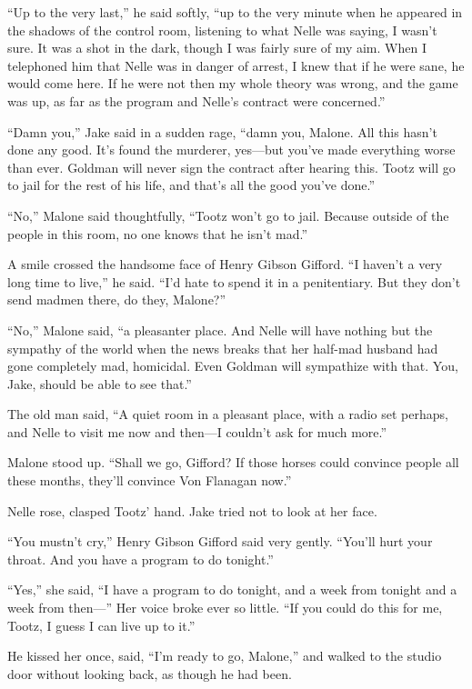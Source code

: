 \documentclass{novel}
\begin{document}
“Up to the very last,” he said softly, “up to the very minute when he appeared in the shadows of the control room, listening to what Nelle was saying, I wasn’t sure. It was a shot in the dark, though I was fairly sure of my aim. When I telephoned him that Nelle was in danger of arrest, I knew that if he were sane, he would come here. If he were not then my whole theory was wrong, and the game was up, as far as the program and Nelle’s contract were concerned.”

“Damn you,” Jake said in a sudden rage, “damn you, Malone. All this hasn’t done any good. It’s found the murderer, yes—but you’ve made everything worse than ever. Goldman will never sign the contract after hearing this. Tootz will go to jail for the rest of his life, and that’s all the good you’ve done.”

“No,” Malone said thoughtfully, “Tootz won’t go to jail. Because outside of the people in this room, no one knows that he isn’t mad.”

A smile crossed the handsome face of Henry Gibson Gifford. “I haven’t a very long time to live,” he said. “I’d hate to spend it in a penitentiary. But they don’t send madmen there, do they, Malone?”

“No,” Malone said, “a pleasanter place. And Nelle will have nothing but the sympathy of the world when the news breaks that her half-mad husband had gone completely mad, homicidal. Even Goldman will sympathize with that. You, Jake, should be able to see that.”

The old man said, “A quiet room in a pleasant place, with a radio set perhaps, and Nelle to visit me now and then—I couldn’t ask for much more.”

Malone stood up. “Shall we go, Gifford? If those horses could convince people all these months, they’ll convince Von Flanagan now.”

Nelle rose, clasped Tootz’ hand. Jake tried not to look at her face.

“You mustn’t cry,” Henry Gibson Gifford said very gently. “You’ll hurt your throat. And you have a program to do tonight.”

“Yes,” she said, “I have a program to do tonight, and a week from tonight and a week from then—” Her voice broke ever so little. “If you could do this for me, Tootz, I guess I can live up to it.”

He kissed her once, said, “I’m ready to go, Malone,” and walked to the studio door without looking back, as though he had been.
\end{document}
